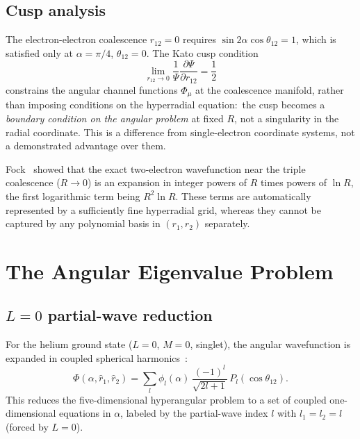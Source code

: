 \documentclass[aps,pra,twocolumn,superscriptaddress,longbibliography]{revtex4-2}
\begin{document}
\subsection{Cusp analysis}

The electron-electron coalescence $r_{12} = 0$ requires
$\sin 2\alpha\cos\theta_{12} = 1$, which is satisfied only at
$\alpha = \pi/4$, $\theta_{12} = 0$.  The Kato cusp
condition~\cite{Kato1957}
\begin{equation}
  \lim_{r_{12}\to 0}\frac{1}{\Psi}
  \frac{\partial\Psi}{\partial r_{12}} = \frac{1}{2}
  \label{eq:kato}
\end{equation}
constrains the angular channel functions $\Phi_\mu$ at the
coalescence manifold, rather than imposing conditions on the
hyperradial equation:\ the cusp becomes a \emph{boundary condition on
the angular problem} at fixed $R$, not a singularity in the radial
coordinate.  This is a difference from single-electron coordinate
systems, not a demonstrated advantage over them.

Fock~\cite{Fock1954} showed that the exact two-electron wavefunction
near the triple coalescence ($R \to 0$) is an expansion in integer
powers of $R$ times powers of $\ln R$, the first logarithmic term
being $R^2\ln R$.  These terms are automatically represented
by a sufficiently fine hyperradial grid, whereas they cannot be
captured by any polynomial basis in $(r_1, r_2)$ separately.


\section{The Angular Eigenvalue Problem}
\label{sec:angular}

\subsection{$L=0$ partial-wave reduction}

For the helium ground state ($L=0$, $M=0$, singlet), the angular
wavefunction is expanded in coupled spherical
harmonics~\cite{Lin1995}:
\begin{equation}
  \Phi(\alpha, \hat{r}_1, \hat{r}_2)
  = \sum_l \phi_l(\alpha)\,
  \frac{(-1)^l}{\sqrt{2l+1}}\,P_l(\cos\theta_{12}).
  \label{eq:pw_expansion}
\end{equation}
This reduces the five-dimensional hyperangular problem to a set of
coupled one-dimensional equations in $\alpha$, labeled by the
partial-wave index $l$ with $l_1 = l_2 = l$ (forced by $L = 0$).
\end{document}
